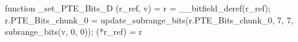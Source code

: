 function _set_PTE_Bits_D (r_ref, v) = {
    r = __bitfield_deref(r_ref);
    r.PTE_Bits_chunk_0 = update_subrange_bits(r.PTE_Bits_chunk_0, 7, 7, subrange_bits(v, 0, 0));
    (*r_ref) = r
}
